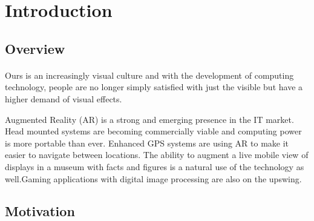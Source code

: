 \section{Introduction}
\label{sec:Introduction}

\subsection{Overview} 
\paragraph{}
Ours is an increasingly visual culture and with the development of computing technology, people are no longer simply satisfied with just the visible but have a higher demand of visual effects.\cite{kenny_2010}
\par Augmented Reality (AR) is a strong and emerging presence in the IT market. Head mounted systems are becoming commercially viable and computing power is more portable than ever. Enhanced GPS systems are using AR to make it easier to navigate between locations. The ability to augment a live mobile view of displays in a museum with facts and figures is a natural use of the technology as well.Gaming applications with digital image processing are also on the upswing. 

\subsection{Motivation}
